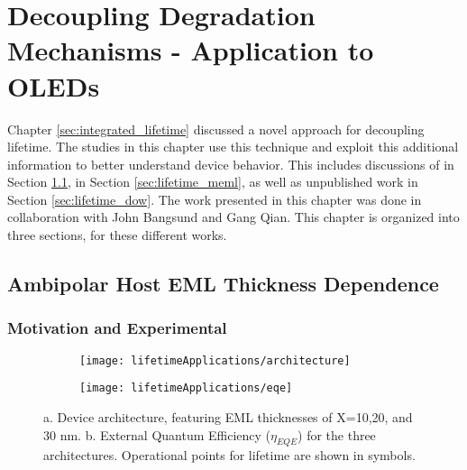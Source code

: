 \documentclass[../thesis.tex]{subfiles}
\begin{document}
\chapter{Decoupling Degradation Mechanisms - Application to OLEDs}\label{sec:decoupling_applications}

Chapter \ref{sec:integrated_lifetime} discussed a novel approach for decoupling lifetime.  
The studies in this chapter use this technique and exploit this additional information to better understand device behavior.
This includes discussions of \textcite{Hershey2017} in Section \ref{sec:cbp_host}, \textcite{Bangsund2018} in Section \ref{sec:lifetime_meml}, as well as unpublished work in Section \ref{sec:lifetime_dow}.
The work presented in this chapter was done in collaboration with John Bangsund and Gang Qian.
This chapter is organized into three sections, for these different works.


\section{Ambipolar Host EML Thickness Dependence}\label{sec:cbp_host}

\subsection{Motivation and Experimental}

\begin{figure}[ht]
\centering
\begin{subfigure}{.17\textheight}
\texttt{[image: lifetimeApplications/architecture]}
\caption{}
\label{fig:cbp_architecture}
\end{subfigure}
\begin{subfigure}{.2\textheight}
\texttt{[image: lifetimeApplications/eqe]}
\caption{}
\label{fig:cbp_eqe}
\end{subfigure}
\caption{a. Device architecture, featuring EML thicknesses of X=10,20, and 30 nm.  b. External Quantum Efficiency ($\eta_{EQE}$) for the three architectures.  Operational points for lifetime are shown in symbols.}
\end{figure}
\end{document}
